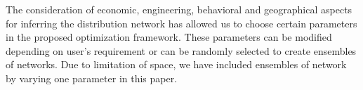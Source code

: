 \documentclass[sigconf]{acmart}
\begin{document}
The consideration of economic, engineering, behavioral and geographical aspects for inferring the distribution network has allowed us to choose certain parameters in the proposed optimization framework. These parameters can be modified depending on user's requirement or can be randomly selected to create ensembles of networks. Due to limitation of space, we have included ensembles of network by varying one parameter in this paper.

\end{document}

